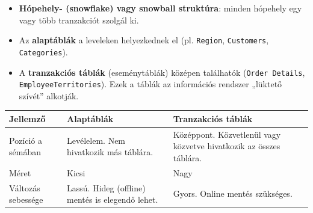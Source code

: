 \documentclass[
  magyar,
]{article}
\providecommand{\tightlist}{%
  \setlength{\itemsep}{0pt}\setlength{\parskip}{0pt}}
\begin{document}
\begin{itemize}
  \begin{itemize}
  \tightlist
  \item
    \textbf{Hópehely- (snowflake) vagy snowball struktúra}: minden
    hópehely egy vagy több tranzakciót szolgál ki.
  \item
    Az \textbf{alaptáblák} a leveleken helyezkednek el (pl.
    \texttt{Region}, \texttt{Customers}, \texttt{Categories}).
  \item
    A \textbf{tranzakciós táblák} (eseménytáblák) középen találhatók
    (\texttt{Order\ Details}, \texttt{EmployeeTerritories}). Ezek a
    táblák az információs rendszer „lüktető szívét'' alkotják.
  \end{itemize}
\end{itemize}

\begin{longtable}[]{@{}
  >{\raggedright\arraybackslash}p{}
  >{\raggedright\arraybackslash}p{}
  >{\raggedright\arraybackslash}p{}@{}}
\toprule\noalign{}
\begin{minipage}[b]{\linewidth}\raggedright
Jellemző
\end{minipage} & \begin{minipage}[b]{\linewidth}\raggedright
Alaptáblák
\end{minipage} & \begin{minipage}[b]{\linewidth}\raggedright
Tranzakciós táblák
\end{minipage} \\
\midrule\noalign{}
\endhead
\bottomrule\noalign{}
\endlastfoot
Pozíció a sémában & Levélelem. Nem hivatkozik más táblára. & Középpont.
Közvetlenül vagy közvetve hivatkozik az összes táblára. \\
Méret & Kicsi & Nagy \\
Változás sebessége & Lassú. Hideg (offline) mentés is elegendő lehet. &
Gyors. Online mentés szükséges. \\
\end{longtable}
\end{document}
